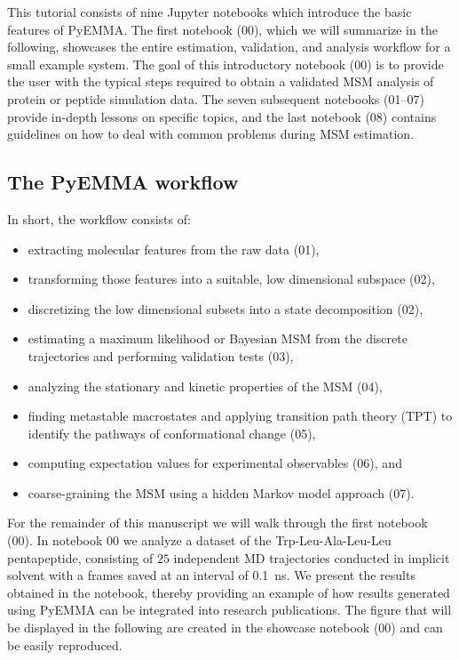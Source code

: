 \documentclass[9pt,tutorial]{livecoms}
\begin{document}
This tutorial consists of nine Jupyter notebooks which introduce the basic features of PyEMMA.
The first notebook (00), which we will summarize in the following, showcases the entire estimation, validation, and analysis workflow for a small example system. 
The goal of this introductory notebook (00) is to provide the user with the typical steps required to obtain a validated MSM analysis of protein or peptide simulation data.
The seven subsequent notebooks (01--07) provide in-depth lessons on specific topics, and the last notebook (08) contains guidelines on how to deal with common problems during MSM estimation.

\subsection{The PyEMMA workflow}

In short, the workflow consists of:
\begin{itemize}
	\item extracting molecular features from the raw data (01),
	\item transforming those features into a suitable, low dimensional subspace (02),
	\item discretizing the low dimensional subsets into a state decomposition (02),
	\item estimating a maximum likelihood or Bayesian MSM from the discrete trajectories and performing validation tests (03),
	\item analyzing the stationary and kinetic properties of the MSM (04),
	\item finding metastable macrostates and applying transition path theory (TPT) to identify the pathways of conformational change (05),
	\item computing expectation values for experimental observables (06), and
	\item coarse-graining the MSM using a hidden Markov model approach (07).
\end{itemize}

For the remainder of this manuscript we will walk through the first notebook (00). In notebook 00 we analyze a dataset of the Trp-Leu-Ala-Leu-Leu pentapeptide, consisting of $25$ independent MD trajectories conducted in implicit solvent with a frames saved at an interval of 0.1~ns. We present the results obtained in the notebook, thereby providing an example of how results generated using PyEMMA can be integrated into research publications.
The figure that will be displayed in the following are created in the showcase notebook (00) and can be easily reproduced.
\end{document}
